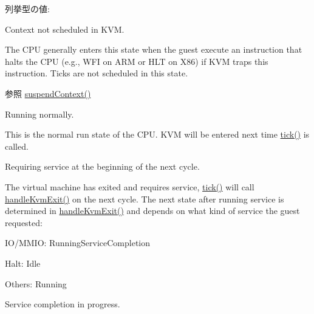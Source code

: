  \begin{Desc}
\item[列挙型の値: ]\par
\begin{description}
\item[{\em 
\hypertarget{classBaseKvmCPU_a67a0db04d321a74b7e7fcfd3f1a3f70bad3fa9ae9431d6cb1772f9d9df48cab19}{
Idle}
\label{classBaseKvmCPU_a67a0db04d321a74b7e7fcfd3f1a3f70bad3fa9ae9431d6cb1772f9d9df48cab19}
}]Context not scheduled in KVM.

The CPU generally enters this state when the guest execute an instruction that halts the CPU (e.g., WFI on ARM or HLT on X86) if KVM traps this instruction. Ticks are not scheduled in this state.

\begin{DoxySeeAlso}{参照}
\hyperlink{classBaseKvmCPU_a1dad4c4d2c3df4ef367e14fcc973ce74}{suspendContext()} 
\end{DoxySeeAlso}
\item[{\em 
\hypertarget{classBaseKvmCPU_a67a0db04d321a74b7e7fcfd3f1a3f70ba2f5f2c4a8c4f4f0519d503dcdfbf55cb}{
Running}
\label{classBaseKvmCPU_a67a0db04d321a74b7e7fcfd3f1a3f70ba2f5f2c4a8c4f4f0519d503dcdfbf55cb}
}]Running normally.

This is the normal run state of the CPU. KVM will be entered next time \hyperlink{classBaseKvmCPU_a873dd91783f9efb4a590aded1f70d6b0}{tick()} is called. \item[{\em 
\hypertarget{classBaseKvmCPU_a67a0db04d321a74b7e7fcfd3f1a3f70ba30f0df86d1d54bb5ea7ee293977f73df}{
RunningService}
\label{classBaseKvmCPU_a67a0db04d321a74b7e7fcfd3f1a3f70ba30f0df86d1d54bb5ea7ee293977f73df}
}]Requiring service at the beginning of the next cycle.

The virtual machine has exited and requires service, \hyperlink{classBaseKvmCPU_a873dd91783f9efb4a590aded1f70d6b0}{tick()} will call \hyperlink{classBaseKvmCPU_ab7dc26d4e02dbccc343942dd7a3ed7d8}{handleKvmExit()} on the next cycle. The next state after running service is determined in \hyperlink{classBaseKvmCPU_ab7dc26d4e02dbccc343942dd7a3ed7d8}{handleKvmExit()} and depends on what kind of service the guest requested: 
\begin{DoxyItemize}
\item IO/MMIO: RunningServiceCompletion 
\item Halt: Idle 
\item Others: Running 
\end{DoxyItemize}\item[{\em 
\hypertarget{classBaseKvmCPU_a67a0db04d321a74b7e7fcfd3f1a3f70ba8d38f5f3c8c186646364b893e12e6ae0}{
RunningServiceCompletion}
\label{classBaseKvmCPU_a67a0db04d321a74b7e7fcfd3f1a3f70ba8d38f5f3c8c186646364b893e12e6ae0}
}]Service completion in progress.


\end{description}
\end{Desc}
